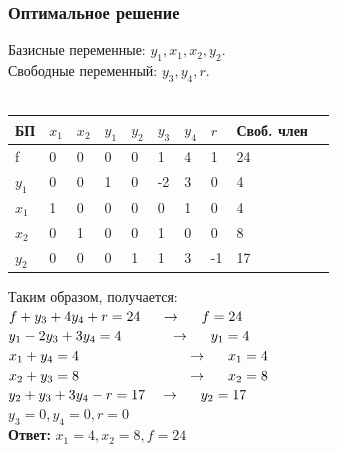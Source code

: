 \documentclass[14pt,a4paper,fleqn]{extarticle}
\begin{document}
\subsubsection*{Оптимальное решение}
Базисные переменные: $y_1, x_1, x_2, y_2$.\\
Свободные переменный: $y_3, y_4, r$.\\\\
\begin{tabularx}{\textwidth}{|p{1cm}|p{1cm}|p{1cm}|p{1cm}|p{1cm}|p{1cm}|p{1cm}|p{1cm}|p{1.2cm}|c}
	\hline
	БП & $x_1$ & $x_2$ & $y_1$ & $y_2$ & $y_3$ & $y_4$ & $r$ & Своб. член & \\
	\hline
	f & 0 & 0 & 0 & 0 & 1 & 4 & 1 & 24 & \\
	\hline
	$y_1$ & 0 & 0 & 1 & 0 & -2 & 3 & 0 & 4 & \\
	\hline
	$x_1$ & 1 & 0 & 0 & 0 & 0 & 1 & 0 & 4\\
	\hline
	$x_2$ & 0 & 1 & 0 & 0 & 1 & 0 & 0 & 8 \\
	\hline
	$y_2$ & 0 & 0 & 0 & 1 & 1 & 3 & -1 & 17\\
	\hline
\end{tabularx}
\newline\newline
Таким образом, получается:\\
$f + y_3 + 4y_4 + r = 24 \hspace*{0.5cm} \rightarrow \hspace*{0.5cm} f = 24$\\
$y_1 - 2y_3 + 3y_4 = 4 \hspace*{1.2cm} \rightarrow \hspace*{0.5cm} y_1 = 4$\\
$x_1 + y_4 = 4 \hspace*{2.7cm} \rightarrow \hspace*{0.5cm} x_1 = 4$\\
$x_2 + y_3 = 8 \hspace*{2.7cm} \rightarrow \hspace*{0.5cm} x_2 = 8$\\
$y_2 + y_3 + 3y_4 - r = 17 \hspace*{0.35cm} \rightarrow \hspace*{0.5cm} y_2 = 17$\\
$y_3 = 0, y_4 = 0, r = 0$\\
\textbf{Ответ:} $x_1 = 4, x_2 = 8, f = 24$
\end{document}
